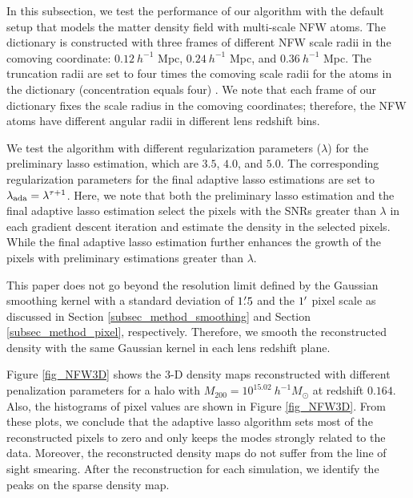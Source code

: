 In this subsection, we test the performance of our algorithm with the default
setup that models the matter density field with multi-scale NFW atoms. The
dictionary is constructed with three frames of different NFW scale radii in the
comoving coordinate: $0.12~h^{-1}$ Mpc, $0.24~h^{-1}$ Mpc, and $0.36~h^{-1}$
Mpc.  The truncation radii are set to four times the comoving scale radii for
the atoms in the dictionary (concentration equals four) . We note that each
frame of our dictionary fixes the scale radius in the comoving coordinates;
therefore, the NFW atoms have different angular radii in different lens
redshift bins.

We test the algorithm with different regularization parameters ($\lambda$) for
the preliminary lasso estimation, which are $3.5$, $4.0$, and $5.0$. The
corresponding regularization parameters for the final adaptive lasso
estimations are set to $\lambda_{\rm{ada}}=\lambda^{\tau+1}$.  Here, we note
that both the preliminary lasso estimation and the final adaptive lasso
estimation select the pixels with the SNRs greater than $\lambda$ in each
gradient descent iteration and estimate the density in the selected pixels.
While the final adaptive lasso estimation further enhances the growth of the
pixels with preliminary estimations greater than $\lambda$.

This paper does not go beyond the resolution limit defined by the Gaussian
smoothing kernel with a standard deviation of $1\mbox{$.\mkern-4mu^\prime$}5$ and the $1\mbox{$^\prime$}$
pixel scale as discussed in Section \ref{subsec_method_smoothing} and Section
\ref{subsec_method_pixel}, respectively.  Therefore, we smooth the
reconstructed density with the same Gaussian kernel in each lens redshift
plane.

Figure \ref{fig_NFW3D} shows the $3$-D density maps reconstructed with
different penalization parameters for a halo with $M_{200}=10^{15.02}
~h^{-1}M_{\odot}$ at redshift $0.164$. Also, the histograms of pixel values are
shown in Figure \ref{fig_NFW3D}. From these plots, we conclude that the
adaptive lasso algorithm sets most of the reconstructed pixels to zero and only
keeps the modes strongly related to the data. Moreover, the reconstructed
density maps do not suffer from the line of sight smearing. After the
reconstruction for each simulation, we identify the peaks on the sparse density
map.

